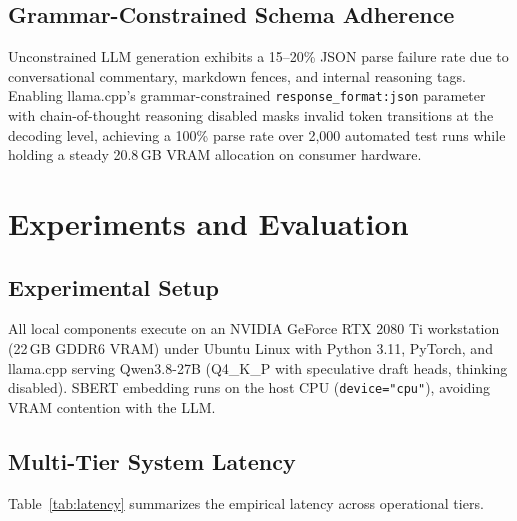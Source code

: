 \documentclass[twoside]{llncs}
\begin{document}
\subsection{Grammar-Constrained Schema Adherence}
Unconstrained LLM generation exhibits a 15--20\% JSON parse failure rate due to conversational commentary, markdown fences, and internal reasoning tags. Enabling llama.cpp's grammar-constrained \texttt{response\_format:\allowbreak json} parameter with chain-of-thought reasoning disabled masks invalid token transitions at the decoding level, achieving a 100\% parse rate over 2,000 automated test runs while holding a steady 20.8\,GB VRAM allocation on consumer hardware.

\section{Experiments and Evaluation}

\subsection{Experimental Setup}
All local components execute on an NVIDIA GeForce RTX 2080 Ti workstation (22\,GB GDDR6 VRAM) under Ubuntu Linux with Python 3.11, PyTorch, and llama.cpp serving Qwen3.8-27B (Q4\_K\_P with speculative draft heads, thinking disabled). SBERT embedding runs on the host CPU (\texttt{device="cpu"}), avoiding VRAM contention with the LLM.

\subsection{Multi-Tier System Latency}
Table~\ref{tab:latency} summarizes the empirical latency across operational tiers.
\end{document}
